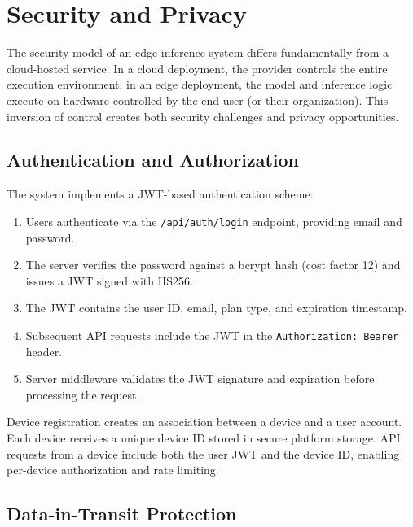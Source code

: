 \documentclass[12pt, letterpaper, twoside]{report}
\begin{document}
\chapter{Security and Privacy}
\label{ch:security}

The security model of an edge inference system differs fundamentally from a cloud-hosted service. In a cloud deployment, the provider controls the entire execution environment; in an edge deployment, the model and inference logic execute on hardware controlled by the end user (or their organization). This inversion of control creates both security challenges and privacy opportunities.

\section{Authentication and Authorization}
\label{sec:auth}

The system implements a JWT-based authentication scheme:

\begin{enumerate}[itemsep=3pt]
\item Users authenticate via the \texttt{/api/auth/login} endpoint, providing email and password.
\item The server verifies the password against a bcrypt hash (cost factor 12) and issues a JWT signed with HS256.
\item The JWT contains the user ID, email, plan type, and expiration timestamp.
\item Subsequent API requests include the JWT in the \texttt{Authorization: Bearer} header.
\item Server middleware validates the JWT signature and expiration before processing the request.
\end{enumerate}

Device registration creates an association between a device and a user account. Each device receives a unique device ID stored in secure platform storage. API requests from a device include both the user JWT and the device ID, enabling per-device authorization and rate limiting.

\section{Data-in-Transit Protection}
\label{sec:transit}
\end{document}
